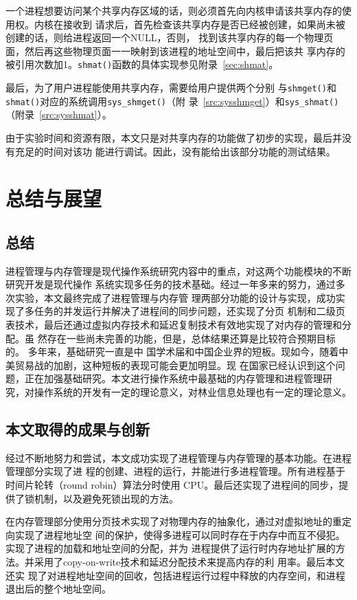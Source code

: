 \documentclass{swfuthesism}
\begin{document}
一个进程想要访问某个共享内存区域的话，则必须首先向内核申请该共享内存的使用权。内核在接收到
请求后，首先检查该共享内存是否已经被创建，如果尚未被创建的话，则给进程返回一个NULL，否则，
找到该共享内存的每一个物理页面，然后再这些物理页面一一映射到该进程的地址空间中，最后把该共
享内存的被引用次数加1。\texttt{shmat()}函数的具体实现参见附录~\ref{sec:shmat}。

最后，为了用户进程能使用共享内存，需要给用户提供两个分别
与\texttt{shmget()}和\texttt{shmat()}对应的系统调用\texttt{sys\_shmget()}（附
录~\ref{src:sysshmget}）和\texttt{sys\_shmat()}（附录~\ref{src:sysshmat}）。

由于实验时间和资源有限，本文只是对共享内存的功能做了初步的实现，最后并没有充足的时间对该功
能进行调试。因此，没有能给出该部分功能的测试结果。
\chapter{总结与展望}

\section{总结}

进程管理与内存管理是现代操作系统研究内容中的重点，对这两个功能模块的不断研究开发是现代操作
系统实现多任务的技术基础。经过一年多来的努力，通过多次实验，本文最终完成了进程管理与内存管
理两部分功能的设计与实现，成功实现了多任务的并发运行并解决了进程间的同步问题，还实现了分页
机制和二级页表技术，最后还通过虚拟内存技术和延迟复制技术有效地实现了对内存的管理和分配。虽
然存在一些尚未完善的功能，但是，总体结果还算是比较符合预期目标的。 多年来，基础研究一直是中
国学术届和中国企业界的短板。现如今，随着中美贸易战的加剧，这种短板的表现可能会更加明显。现
在国家已经认识到这个问题，正在加强基础研究。本文进行操作系统中最基础的内存管理和进程管理研
究，对操作系统的开发有一定的理论意义，对林业信息处理也有一定的理论意义。

\section{本文取得的成果与创新}

经过不断地努力和尝试，本文成功实现了进程管理与内存管理的基本功能。在进程管理部分实现了进
程的创建、进程的运行，并能进行多进程管理。所有进程基于时间片轮转（round robin）算法分时使用
CPU。最后还实现了进程间的同步，提供了锁机制，以及避免死锁出现的方法。

在内存管理部分使用分页技术实现了对物理内存的抽象化，通过对虚拟地址的重定向实现了进程地址空
间的保护，使得多进程可以同时存在于内存中而互不侵犯。实现了进程的加载和地址空间的分配，并为
进程提供了运行时内存地址扩展的方法。并采用了copy-on-write技术和延迟分配技术来提高内存的利
用率。最后本文还实
现了对进程地址空间的回收，包括进程运行过程中释放的内存空间，和进程退出后的整个地址空间。  
\end{document}
